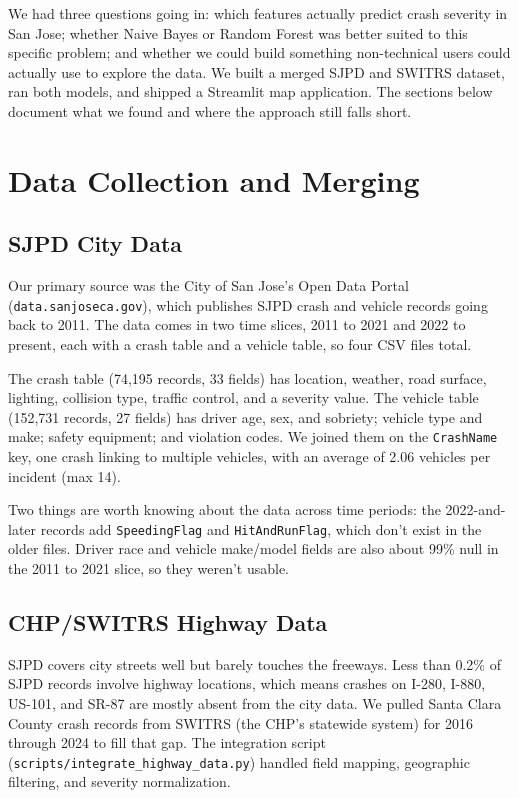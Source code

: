 \documentclass[conference]{IEEEtran}
\begin{document}
We had three questions going in: which features actually predict crash severity in San Jose; whether Naive Bayes or Random Forest was better suited to this specific problem; and whether we could build something non-technical users could actually use to explore the data. We built a merged SJPD and SWITRS dataset, ran both models, and shipped a Streamlit map application. The sections below document what we found and where the approach still falls short.

\section{Data Collection and Merging}

\subsection{SJPD City Data}

Our primary source was the City of San Jose's Open Data Portal (\texttt{data.sanjoseca.gov}), which publishes SJPD crash and vehicle records going back to 2011. The data comes in two time slices, 2011 to 2021 and 2022 to present, each with a crash table and a vehicle table, so four CSV files total.

The crash table (74,195 records, 33 fields) has location, weather, road surface, lighting, collision type, traffic control, and a severity value. The vehicle table (152,731 records, 27 fields) has driver age, sex, and sobriety; vehicle type and make; safety equipment; and violation codes. We joined them on the \texttt{CrashName} key, one crash linking to multiple vehicles, with an average of 2.06 vehicles per incident (max 14).

Two things are worth knowing about the data across time periods: the 2022-and-later records add \texttt{SpeedingFlag} and \texttt{HitAndRunFlag}, which don't exist in the older files. Driver race and vehicle make/model fields are also about 99\% null in the 2011 to 2021 slice, so they weren't usable.

\subsection{CHP/SWITRS Highway Data}

SJPD covers city streets well but barely touches the freeways. Less than 0.2\% of SJPD records involve highway locations, which means crashes on I-280, I-880, US-101, and SR-87 are mostly absent from the city data. We pulled Santa Clara County crash records from SWITRS (the CHP's statewide system) for 2016 through 2024 to fill that gap. The integration script (\texttt{scripts/integrate\_highway\_data.py}) handled field mapping, geographic filtering, and severity normalization.
\end{document}

